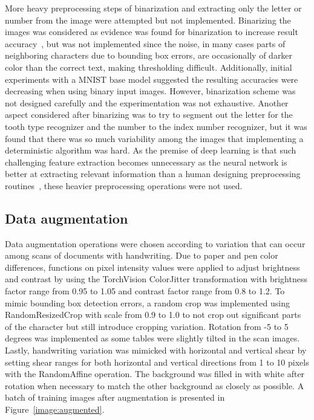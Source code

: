 \documentclass[english,twoside,openright]{UH_DS_MSc}
\begin{document}
More heavy preprocessing steps of binarization and extracting only the letter or number from the image were 
attempted but not implemented.
Binarizing the images was considered as evidence was found for binarization to increase result accuracy~\cite{9thuonPalm},
but was not implemented since the noise, in many cases
 parts of neighboring characters due to bounding box errors, are occasionally of darker 
color than the correct text, making thresholding difficult. Additionally,
 initial experiments with a MNIST base model suggested the resulting
accuracies were decreasing when using binary input images. However, binarization scheme was not designed carefully 
and the experimentation was not exhaustive.
Another aspect considered after binarizing was to try to segment out the letter for the tooth type recognizer 
and the number to the index number recognizer, but it was found that there was so much variability 
among the images that implementing a deterministic algorithm was hard. 
As the premise of deep learning is that such challenging feature extraction becomes unnecessary as the neural 
network is better at extracting relevant information than a human designing preprocessing routines~\cite{princebook}, these 
heavier preprocessing operations were not used.

\subsection{Data augmentation}
\label{sect:aug}

Data augmentation operations were chosen according to variation that can 
occur among scans of documents with handwriting.
Due to paper and pen color differences, functions on pixel intensity
values were applied to adjust brightness and contrast by using the 
TorchVision ColorJitter transformation with brightness factor range from 
0.95 to 1.05 and contrast factor range from 0.8 to 1.2. To mimic bounding box detection errors, 
a random crop was implemented using RandomResizedCrop with 
scale from 0.9 to 1.0 to not crop out significant parts of the character but 
still introduce cropping variation. Rotation from -5 to 5 degrees 
was implemented as some tables were slightly tilted in the scan images. 
Lastly, handwriting variation was mimicked with horizontal and vertical 
shear by setting shear ranges for both horizontal and vertical directions from 1 
to 10 pixels with the RandomAffine operation. The background was filled in 
with white after rotation when necessary to match the other background as closely as possible.
 A batch of training images after augmentation
is presented in Figure~\ref{image:augmented}.
\end{document}
